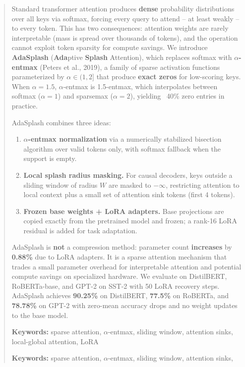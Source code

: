 \documentclass{article}
\begin{document}
\maketitle

\begin{abstract}
Standard transformer attention produces \textbf{dense} probability distributions 
over all keys via softmax, forcing every query to attend -- at least weakly -- 
to every token. This has two consequences: attention weights are rarely 
interpretable (mass is spread over thousands of tokens), and the operation 
cannot exploit token sparsity for compute savings. We introduce \textbf{AdaSplash} 
(\textbf{Ada}ptive \textbf{Splash} Attention), which replaces softmax with \textbf{$\alpha$-entmax} 
(Peters et al., 2019), a family of sparse activation functions parameterized 
by $\alpha \in (1, 2]$ that produce \textbf{exact zeros} for low-scoring keys. 
When $\alpha = 1.5$, $\alpha$-entmax is 1.5-entmax, which interpolates between 
softmax ($\alpha = 1$) and sparsemax ($\alpha = 2$), yielding ~40\% zero 
entries in practice.

AdaSplash combines three ideas:

\begin{enumerate}
\item \textbf{$\alpha$-entmax normalization} via a numerically stabilized bisection algorithm
  over valid tokens only, with softmax fallback when the support is empty.
\item \textbf{Local splash radius masking.} For causal decoders, keys outside a
  sliding window of radius $W$ are masked to $-\infty$, restricting attention
  to local context plus a small set of attention sink tokens (first 4 tokens).
\item \textbf{Frozen base weights + LoRA adapters.} Base projections are copied
  exactly from the pretrained model and frozen; a rank-16 LoRA residual
  is added for task adaptation.

\end{enumerate}
AdaSplash is \textbf{not} a compression method: parameter count \textbf{increases} by 
\textbf{0.88\%} due to LoRA adapters. It is a sparse attention mechanism 
that trades a small parameter overhead for interpretable attention and potential 
compute savings on specialized hardware. We evaluate on DistilBERT, RoBERTa-base, 
and GPT-2 on SST-2 with 50 LoRA recovery steps. AdaSplash 
achieves \textbf{90.25\%} on DistilBERT, \textbf{77.5\%} on RoBERTa, and 
\textbf{78.78\%} on GPT-2 with zero-mean accuracy drops and no weight updates 
to the base model.

\textbf{Keywords:} sparse attention, $\alpha$-entmax, sliding window, attention sinks, 
local-global attention, LoRA



\vspace{0.5em}
\noindent\textbf{Keywords:} sparse attention, $\alpha$-entmax, sliding window, attention sinks,
\end{abstract}
\end{document}
